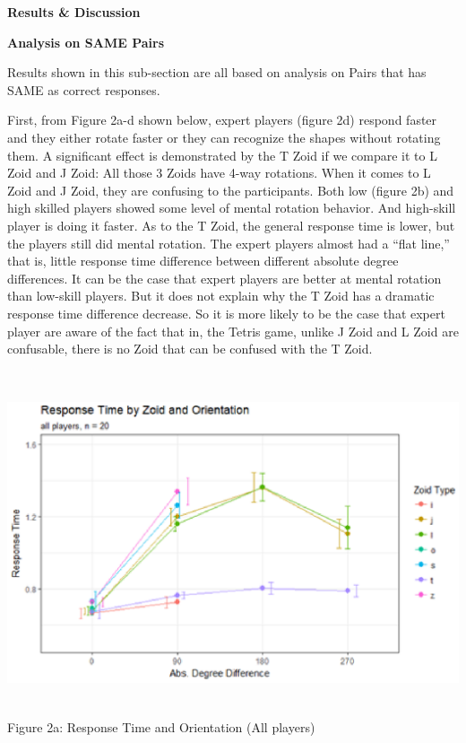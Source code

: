 \documentclass{article}
\begin{document}
	\noindent \textbf{Results \& Discussion}
	
	\noindent \textbf{Analysis on SAME Pairs}
	
	\noindent Results shown in this sub-section are all based on analysis on Pairs that has SAME as correct responses.
	
	\noindent First, from Figure 2a-d shown below, expert players (figure 2d) respond faster and they either rotate faster or they can recognize the shapes without rotating them. A significant effect is demonstrated by the T Zoid if we compare it to L Zoid and J Zoid: All those 3 Zoids have 4-way rotations. When it comes to L Zoid and J Zoid, they are confusing to the participants. Both low (figure 2b) and high skilled players showed some level of mental rotation behavior. And high-skill player is doing it faster. As to the T Zoid, the general response time is lower, but the players still did mental rotation. The expert players almost had a ``flat line,'' that is, little response time difference between different absolute degree differences. It can be the case that expert players are better at mental rotation than low-skill players. But it does not explain why the T Zoid has a dramatic response time difference decrease. So it is more likely to be the case that expert player are aware of the fact that in, the Tetris game, unlike J Zoid and L Zoid are confusable, there is no Zoid that can be confused with the T Zoid. 
	
	\noindent \includegraphics*[width=6.49in, height=4.00in, keepaspectratio=false]{image15} Figure 2a: Response Time and Orientation (All players)
	
\end{document}
